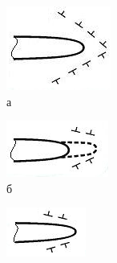\begin{figure}[H]
    \centering
    \begin{subfigure}[b]{0.22\textwidth}
        \centering
        \includegraphics[width=\linewidth]{assets/1320}
		\caption*{а}
    \end{subfigure}
    \hfill
    \begin{subfigure}[b]{0.22\textwidth}
        \centering
        \includegraphics[width=\linewidth]{assets/1321}
		\caption*{б}
    \end{subfigure}
    \hfill
    \begin{subfigure}[b]{0.22\textwidth}
        \centering
        \includegraphics[width=\linewidth]{assets/1322}

\end{subfigure}
\end{figure}
